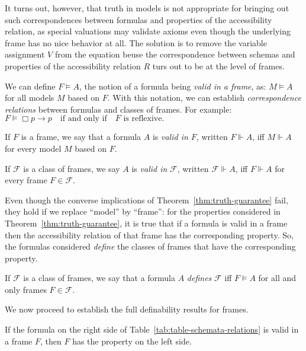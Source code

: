 It turns out, however, that truth in models is not appropriate for 
bringing out such correspondences between formulas and properties of 
the accessibility relation, as special valuations may validate axioms 
even though the underlying frame has no nice behavior at all. 
The solution is to remove the variable assignment $V$ from the equation beuse 
the correspondence between schemas and properties of the accessibility relation 
$R$ turs out to be at the level of frames.

We can define $F \vDash A$, the notion of a formula being \emph{valid in a frame}, 
as: $M \vDash A$ for all models $M$ based on $F$. With this notation, we can establish 
\emph{correspondence relations} between formulas and classes of frames. For example:
$F \vDash \Box p \rightarrow p \quad \text{if and only if} \quad F \text{ is reflexive.}$

\begin{definition}
  \label{valid-in-frame}
  \leanok
  
  If $F$ is a frame, we say that a formula $A$ is \emph{valid in $F$}, written $F \Vdash A$,
  iff $M \Vdash A$ for every model $M$ based on $F$.

  If $\mathcal{F}$ is a class of frames, we say $A$ is \emph{valid in} $\mathcal{F}$, written $\mathcal{F} \Vdash A$, 
  iff $F \Vdash A$ for every frame $F \in \mathcal{F}$.
\end{definition}


Even though the converse implications of Theorem~\ref{thm:truth-guarantee} 
fail, they hold if we replace ``model'' by ``frame'': for the properties 
considered in Theorem~\ref{thm:truth-guarantee}, it is true that if a 
formula is valid in a frame then the accessibility relation of that frame 
has the corresponding property. So, the formulas considered 
\emph{define} the classes of frames that have the corresponding property.

\begin{definition}
  \label{def:frame-definition}
  If $\mathcal{F}$ is a class of frames, we say that a formula $A$ 
  \emph{defines} $\mathcal{F}$ iff $F \vDash A$ for all and only frames 
  $F \in \mathcal{F}$.
\end{definition}

We now proceed to establish the full definability results for frames.

\begin{theorem}
  \label{thm:definability}
  \leanok
  
  If the formula on the right side of Table~\ref{tab:table-schemata-relations} is valid in a frame $F$, 
  then $F$ has the property on the left side.
\end{theorem}

